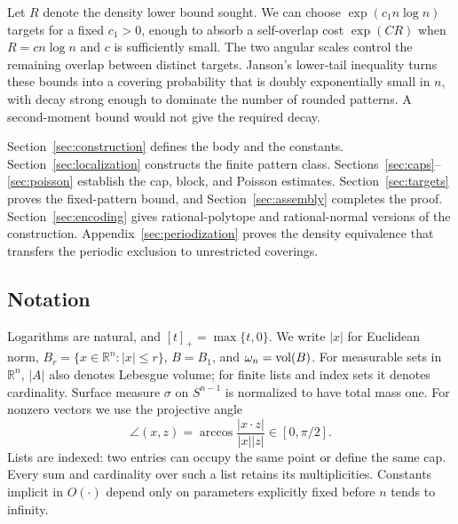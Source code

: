 Let $R$ denote the density lower bound sought. We can choose
$\exp(c_1n\log n)$ targets for a fixed $c_1>0$, enough to absorb a
self-overlap cost $\exp(CR)$ when $R=c n\log n$ and $c$ is sufficiently
small. The two angular scales control the remaining overlap between
distinct targets. Janson's lower-tail inequality turns these bounds into
a covering probability that is doubly exponentially small in $n$, with
decay strong enough to dominate the number of rounded patterns.
A second-moment bound would not give the required decay.

Section~\ref{sec:construction} defines the body and the constants.
Section~\ref{sec:localization} constructs the finite pattern class.
Sections~\ref{sec:caps}--\ref{sec:poisson} establish the cap, block, and
Poisson estimates. Section~\ref{sec:targets} proves the fixed-pattern bound,
and Section~\ref{sec:assembly} completes the proof.
Section~\ref{sec:encoding} gives rational-polytope and rational-normal
versions of the construction.
Appendix~\ref{sec:periodization} proves the density equivalence that
transfers the periodic exclusion to unrestricted coverings.

\subsection{Notation}

Logarithms are natural, and $[t]_+=\max\{t,0\}$. We write $|x|$ for Euclidean norm,
$B_r=\{x\in\mathbb R^n:|x|\le r\}$, $B=B_1$, and
$\omega_n=\operatorname{vol}(B)$. For measurable sets in $\mathbb R^n$, $|A|$ also denotes
Lebesgue volume; for finite lists and index sets it denotes cardinality.
Surface measure $\sigma$ on $S^{n-1}$ is normalized to have total mass one.
For nonzero vectors we use the projective angle
\[
 \angle(x,z)=\arccos\frac{|x\cdot z|}{|x||z|}\in[0,\pi/2].
\]
Lists are indexed: two entries can occupy the same point or define the same
cap. Every sum and cardinality over such a list retains its multiplicities.
Constants implicit in $O(\cdot)$ depend only on parameters explicitly fixed
before $n$ tends to infinity.
